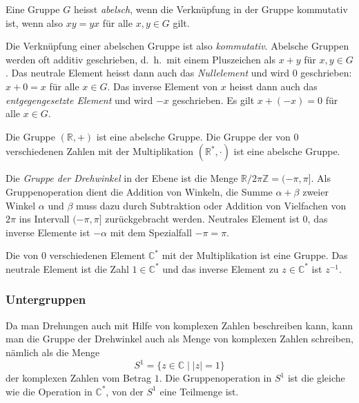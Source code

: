 \begin{definition}
\label{buch:gruppen:definition:abelsch}
Eine Gruppe $G$ heisst {\em abelsch}, wenn 
die Verknüpfung in der Gruppe kommutativ ist, wenn also
$xy=yx$ für alle $x,y\in G$ gilt.
\end{definition}

Die Verknüpfung einer abelschen Gruppe ist also {\em kommutativ}.
%
Abelsche Gruppen werden oft additiv geschrieben, d.~h.~mit einem
Pluszeichen als $x+y$ für $x,y\in G$.
Das neutrale Element heisst dann auch das {\em Nullelement} und wird $0$
geschrieben: $x+0=x$ für alle $x\in G$.
Das inverse Element von $x$ heisst dann auch das
{\em entgegengesetzte Element} und wird $-x$ geschrieben. 
Es gilt $x+(-x)=0$ für alle $x\in G$.

\begin{beispiel}
Die Gruppe $(\mathbb{R},+)$ ist eine abelsche Gruppe.
Die Gruppe der von $0$ verschiedenen Zahlen mit der Multiplikation
$(\mathbb{R}^*,\cdot)$ ist eine abelsche Gruppe.
\end{beispiel}

\begin{beispiel}
Die {\em Gruppe der Drehwinkel} in der Ebene ist die Menge
\(
\mathbb{R}/2\pi\mathbb{Z}
=
(-\pi,\pi].
\)
Als Gruppenoperation dient die Addition von Winkeln, die Summe
$\alpha+\beta$ zweier Winkel $\alpha$ und $\beta$ muss dazu durch
Subtraktion oder Addition von Vielfachen von $2\pi$ ins Intervall
$(-\pi,\pi]$ zurückgebracht werden.
Neutrales Element ist $0$, das inverse Elemente ist $-\alpha$ mit
dem Spezialfall $-\pi=\pi$.
\end{beispiel}

\begin{beispiel}
Die von $0$ verschiedenen Element $\mathbb{C}^*$ mit der Multiplikation
ist eine Gruppe.
Das neutrale Element ist die Zahl $1\in\mathbb{C}^*$ und das inverse
Element zu $z\in\mathbb{C}^*$ ist $z^{-1}$.
\end{beispiel}

%
%
\subsubsection{Untergruppen}
Da man Drehungen auch mit Hilfe von komplexen Zahlen beschreiben kann,
kann man die Gruppe der Drehwinkel auch als Menge von komplexen Zahlen
schreiben, nämlich als die Menge
\[
S^1
=
\{z\in\mathbb{C}\mid |z|=1\}
\]
der komplexen Zahlen vom Betrag $1$.
Die Gruppenoperation in $S^1$ ist die gleiche wie die Operation
in $\mathbb{C}^*$, von der $S^1$ eine Teilmenge ist.

